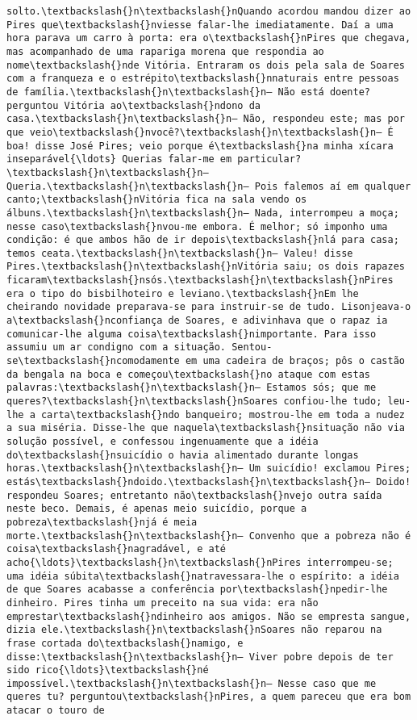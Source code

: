 \begin{Verbatim}[commandchars=\\\{\}]
solto.\textbackslash{}n\textbackslash{}nQuando acordou mandou dizer ao Pires que\textbackslash{}nviesse falar-lhe imediatamente. Daí a uma hora parava um carro à porta: era o\textbackslash{}nPires que chegava, mas acompanhado de uma rapariga morena que respondia ao nome\textbackslash{}nde Vitória. Entraram os dois pela sala de Soares com a franqueza e o estrépito\textbackslash{}nnaturais entre pessoas de família.\textbackslash{}n\textbackslash{}n— Não está doente? perguntou Vitória ao\textbackslash{}ndono da casa.\textbackslash{}n\textbackslash{}n— Não, respondeu este; mas por que veio\textbackslash{}nvocê?\textbackslash{}n\textbackslash{}n— É boa! disse José Pires; veio porque é\textbackslash{}na minha xícara inseparável{\ldots} Querias falar-me em particular?\textbackslash{}n\textbackslash{}n— Queria.\textbackslash{}n\textbackslash{}n— Pois falemos aí em qualquer canto;\textbackslash{}nVitória fica na sala vendo os álbuns.\textbackslash{}n\textbackslash{}n— Nada, interrompeu a moça; nesse caso\textbackslash{}nvou-me embora. É melhor; só imponho uma condição: é que ambos hão de ir depois\textbackslash{}nlá para casa; temos ceata.\textbackslash{}n\textbackslash{}n— Valeu! disse Pires.\textbackslash{}n\textbackslash{}nVitória saiu; os dois rapazes ficaram\textbackslash{}nsós.\textbackslash{}n\textbackslash{}nPires era o tipo do bisbilhoteiro e leviano.\textbackslash{}nEm lhe cheirando novidade preparava-se para instruir-se de tudo. Lisonjeava-o a\textbackslash{}nconfiança de Soares, e adivinhava que o rapaz ia comunicar-lhe alguma coisa\textbackslash{}nimportante. Para isso assumiu um ar condigno com a situação. Sentou-se\textbackslash{}ncomodamente em uma cadeira de braços; pôs o castão da bengala na boca e começou\textbackslash{}no ataque com estas palavras:\textbackslash{}n\textbackslash{}n— Estamos sós; que me queres?\textbackslash{}n\textbackslash{}nSoares confiou-lhe tudo; leu-lhe a carta\textbackslash{}ndo banqueiro; mostrou-lhe em toda a nudez a sua miséria. Disse-lhe que naquela\textbackslash{}nsituação não via solução possível, e confessou ingenuamente que a idéia do\textbackslash{}nsuicídio o havia alimentado durante longas horas.\textbackslash{}n\textbackslash{}n— Um suicídio! exclamou Pires; estás\textbackslash{}ndoido.\textbackslash{}n\textbackslash{}n— Doido! respondeu Soares; entretanto não\textbackslash{}nvejo outra saída neste beco. Demais, é apenas meio suicídio, porque a pobreza\textbackslash{}njá é meia morte.\textbackslash{}n\textbackslash{}n— Convenho que a pobreza não é coisa\textbackslash{}nagradável, e até acho{\ldots}\textbackslash{}n\textbackslash{}nPires interrompeu-se; uma idéia súbita\textbackslash{}natravessara-lhe o espírito: a idéia de que Soares acabasse a conferência por\textbackslash{}npedir-lhe dinheiro. Pires tinha um preceito na sua vida: era não emprestar\textbackslash{}ndinheiro aos amigos. Não se empresta sangue, dizia ele.\textbackslash{}n\textbackslash{}nSoares não reparou na frase cortada do\textbackslash{}namigo, e disse:\textbackslash{}n\textbackslash{}n— Viver pobre depois de ter sido rico{\ldots}\textbackslash{}né impossível.\textbackslash{}n\textbackslash{}n— Nesse caso que me queres tu? perguntou\textbackslash{}nPires, a quem pareceu que era bom atacar o touro de 
\end{Verbatim}
